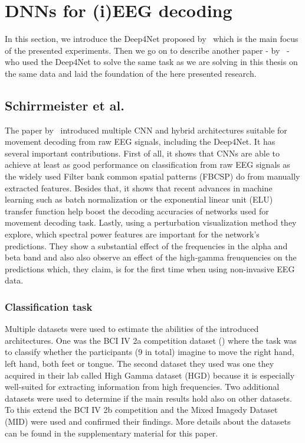 \section{DNNs for (i)EEG decoding}
\label{sec:dnn-decoding}
In this section, we introduce the Deep4Net proposed by~\cite{schirrmeister-deep-2017} which is the main focus of the presented experiments.
Then we go on to describe another paper - by~\cite{Hammer-2021} - who used the Deep4Net to solve the same task as we are solving in this thesis on the same data and laid the foundation of the here presented research.

\subsection{Schirrmeister et al.}\label{subsec:schirrmeister-et-al}
The paper by~\cite{schirrmeister-deep-2017} introduced multiple CNN and hybrid architectures suitable for movement decoding from raw EEG signals, including the Deep4Net.
It has several important contributions.
First of all, it shows that CNNs are able to achieve at least as good performance on classification from raw EEG signals as the widely used Filter bank common spatial patterns (FBCSP) do from manually extracted features.
Besides that, it shows that recent advances in machine learning such as batch normalization or the exponential linear unit (ELU) transfer function help boost the decoding accuracies of networks used for movement decoding task.
Lastly, using a perturbation visualization method they explore, which spectral power features are important for the network's predictions.
They show a substantial effect of the frequencies in the alpha and beta band and also also observe an effect of the high-gamma freuquencies on the predictions which, they claim, is for the first time when using non-invasive EEG data.

\subsubsection{Classification task}
Multiple datasets were used to estimate the abilities of the introduced architectures.
One was the BCI IV 2a competition dataset (\cite{brunner2008bci}) where the task was to classify whether the participants (9 in total) imagine to move the right hand, left hand, both feet or tongue.
The second dataset they used was one they acquired in their lab called High Gamma dataset (HGD) because it is especially well-suited for extracting information from high frequencies.
Two additional datasets were used to determine if the main results hold also on other datasets. 
To this extend the BCI IV 2b competition and the Mixed Imagedy Dataset (MID) were used and confirmed their findings. More details about the datasets can be found in the supplementary material for this paper.


